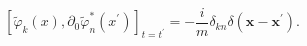 \begin{equation}
\left[ \widetilde{\varphi} _k(x),\partial_0
\widetilde{\varphi}_{n}^{*}(x^{\prime })\right] _{t=t^{\prime
}}=-\frac{i}{m}\delta _{kn}\delta (\mathbf{x}-\mathbf{x}^{\prime
}) . \label{88}
\end{equation}

